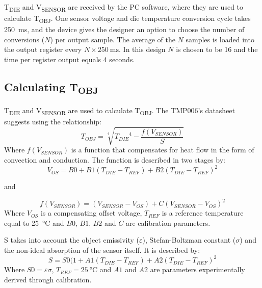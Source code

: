 \medskip

T\textsubscript{DIE} and V\textsubscript{SENSOR} are received by the PC software, where they are used to calculate T\textsubscript{OBJ}. One sensor voltage and die temperature conversion cycle takes \SI{250}{\milli\second}, and the device gives the designer an option to choose the number of conversions ($N$) per output sample. The average of the $N$ samples is loaded into the output register every $N\times\SI{250}{\milli\second}$. In this design $N$ is chosen to be 16 and the time per register output equals 4 seconds.

\subsection{Calculating T\textsubscript{OBJ}}
T\textsubscript{DIE} and V\textsubscript{SENSOR} are used to calculate T\textsubscript{OBJ}. The TMP006's datasheet suggests using the relationship:
\begin{equation}
\label{eq:TempCurve1}
	T_{OBJ} = \sqrt[4]{{T_{DIE}}^4-\frac{f(V_{SENSOR})}{S}}
\end{equation}
Where $f(V_{SENSOR})$ is a function that compensates for heat flow in the form of convection and conduction. The function is described in two stages by:
\begin{equation}
\label{eq:TempCurve2}
	V_{OS}=B0+B1(T_{DIE}-T_{REF})+B2(T_{DIE}-T_{REF})^2
\end{equation}
\begin{center}and\end{center}
\begin{equation}
\label{eq:TempCurve3}
	f(V_{SENSOR}) = (V_{SENSOR}-V_{OS})+C(V_{SENSOR}-V_{OS})^2
\end{equation}
Where $V_{OS}$ is a compensating offset voltage, $T_{REF}$ is a reference temperature equal to \SI{25}{\celsius} and $B0$, $B1$, $B2$ and $C$ are calibration parameters.

\medskip

S takes into account the object emissivity ($\varepsilon$), Stefan-Boltzman constant ($\sigma$) and the non-ideal absorption of the sensor itself. It is described by:
\begin{equation}
\label{eq:TempCurve4}
	S=S0(1+A1(T_{DIE}-T_{REF})+A2(T_{DIE}-T_{REF})^2
\end{equation}
Where $S0 = \varepsilon\sigma$, $T_{REF}=\SI{25}{\celsius}$ and $A1$ and $A2$ are parameters experimentally derived through calibration.

